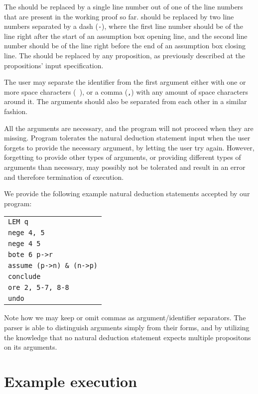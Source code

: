\documentclass{article}
\begin{document}
The \AN{} should be replaced by a single line number out of one of the
line numbers that are present in the working proof so far. \AR{} should
be replaced by two line numbers separated by a dash (\verb|-|), where
the first line number should be of the line right after the start of
an assumption box opening line, and the second line number should be of
the line right before the end of an assumption box closing line. 
The \AF{} should be replaced by any proposition, as previously described
at the propositions' input specification.

The user may separate the identifier from the first argument either with
one or more space characters (\verb| |), or a comma (\verb|,|)
with any amount of space characters around it. The arguments should also
be separated from each other in a similar fashion.

All the arguments are necessary, and the program will not proceed when
they are missing. Program tolerates the natural deduction statement input
when the user forgets to provide the necessary \AF{} argument, by letting
the user try again. However, forgetting to provide other types of arguments,
or providing different types of arguments than necessary, may possibly not
be tolerated and result in an error and therefore termination of execution.

We provide the following example natural deduction statements accepted by
our program:

\begin{center}
	\begin{tabular}{l}
		\verb^LEM q^\\
		\verb^nege 4, 5^\\
		\verb^nege 4 5^\\
		\verb^bote 6 p->r^\\
		\verb^assume (p->n) & (n->p)^\\
		\verb^conclude^\\
		\verb^ore 2, 5-7, 8-8^\\
		\verb^undo^
	\end{tabular}
\end{center}

Note how we may keep or omit commas as argument/identifier separators.
The parser is able to distinguish arguments simply from their forms,
and by utilizing the knowledge that no natural deduction statement
expects multiple propositons on its arguments.

\section{Example execution}
\end{document}
